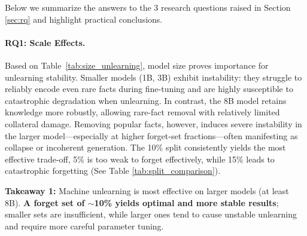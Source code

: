 \documentclass[sigconf,anonymous]{aamas}
\begin{document}

    

Below we summarize the answers to the 3 research questions raised in Section \ref{sec:rq} and highlight practical conclusions.

\paragraph{RQ1: Scale Effects.}  
Based on Table~\ref{tab:size_unlearning}, model size proves importance for unlearning stability. Smaller models (1B, 3B) exhibit instability: they struggle to reliably encode even rare facts during fine-tuning and are highly susceptible to catastrophic degradation when unlearning. In contrast, the 8B model retains knowledge more robustly, allowing rare-fact removal with relatively limited collateral damage. Removing popular facts, however, induces severe instability in the larger model—especially at higher forget-set fractions—often manifesting as collapse or incoherent generation. The 10\% split consistently yields the most effective trade-off, 5\% is too weak to forget effectively, while 15\% leads to catastrophic forgetting (See Table \ref{tab:split_comparison}).

\begin{tcolorbox}[colback=gray!10, colframe=black!50, 
  boxrule=0.5pt, arc=3pt, left=6pt, right=6pt, top=4pt, bottom=4pt]
\textbf{Takeaway 1:} Machine unlearning is most effective on larger models (at least 8B). \textbf{A forget set of $\sim$10\% yields optimal and more stable results}; smaller sets are insufficient, while larger ones tend to cause unstable unlearning and require more careful parameter tuning.
\end{tcolorbox}
\end{document}
